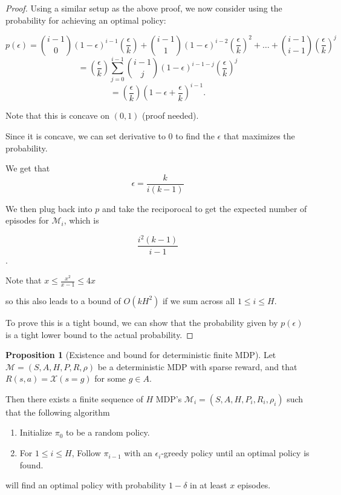 \documentclass[12pt, letterpaper]{article}
\theoremstyle{definition}
\newtheorem*{prop}{Proposition}
\theoremstyle{remark}
\begin{document}
\begin{proof}[Proof]
    Using a similar setup as the above proof, we now consider using the probability for achieving an optimal policy:

    \[p(\epsilon) = {i-1 \choose 0} (1-\epsilon)^{i-1}(\frac{\epsilon}{k}) + {i-1 \choose 1}(1-\epsilon)^{i-2}(\frac{\epsilon}{k})^2 + \ldots + {i-1 \choose i-1} (\frac{\epsilon}{k})^j\]
    \[= (\frac{\epsilon}{k})\sum_{j=0}^{i-1}{i-1 \choose j} (1-\epsilon)^{i-1-j}(\frac{\epsilon}{k})^{j}\]
    \[= (\frac{\epsilon}{k})(1-\epsilon + \frac{\epsilon}{k})^{i-1}.\]

    Note that this is concave on \((0, 1)\) (proof needed).

    Since it is concave, we can set derivative to 0 to find the \(\epsilon\) that maximizes the probability.

    We get that
    \[\epsilon = \frac{k}{i(k-1)}\]

    We then plug back into \(p\) and take the reciporocal to get the expected number of episodes for \(\mathcal{M}_i\), which is

    \[\frac{i^2(k-1)}{i-1}\].

    Note that \(x \leq \frac{x^2}{x-1} \leq 4x\)

    so this also leads to a bound of \(O(kH^2)\) if we sum across all \(1 \leq i \leq H\).

    To prove this is a tight bound, we can show that the probability given by \(p(\epsilon)\) is a tight lower bound to the actual probability.
\end{proof}

\begin{prop}[Existence and bound for deterministic finite MDP]
    Let \(\mathcal{M} = (S, A, H, P, R, \rho)\) be a deterministic MDP with sparse reward, and that \(R(s, a) = \mathcal{X}(s = g)\) for some \(g \in A\).
    
    Then there exists a finite sequence of $H$ MDP's \(\mathcal{M}_i = (S, A, H, P_i, R_i, \rho_i)\) such that the following algorithm

    \begin{enumerate}
        \item Initialize \(\pi_0\) to be a random policy.
        \item For \(1 \leq i \leq H\), Follow \(\pi_{i-1}\) with an \(\epsilon_i\)-greedy policy until an optimal policy is found.
    \end{enumerate}

    will find an optimal policy with probability \(1 - \delta\) in at least \(x\) episodes.
\end{prop}
\end{document}
